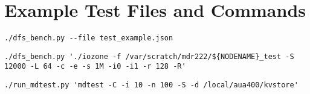 
\chapter{Example Test Files and Commands} %

\label{AppendixA} %






\begin{lstlisting}[caption=Running benchmark from a file]
./dfs_bench.py --file test_example.json
\end{lstlisting}

\begin{lstlisting}[caption=Running 1 to 1 read benchmark directly]
./dfs_bench.py './iozone -f /var/scratch/mdr222/${NODENAME}_test -S 12000 -L 64 -c -e -s 1M -i0 -i1 -r 128 -R'
\end{lstlisting}

\begin{lstlisting}[caption=Running mdtest]
./run_mdtest.py 'mdtest -C -i 10 -n 100 -S -d /local/aua400/kvstore'
\end{lstlisting}

